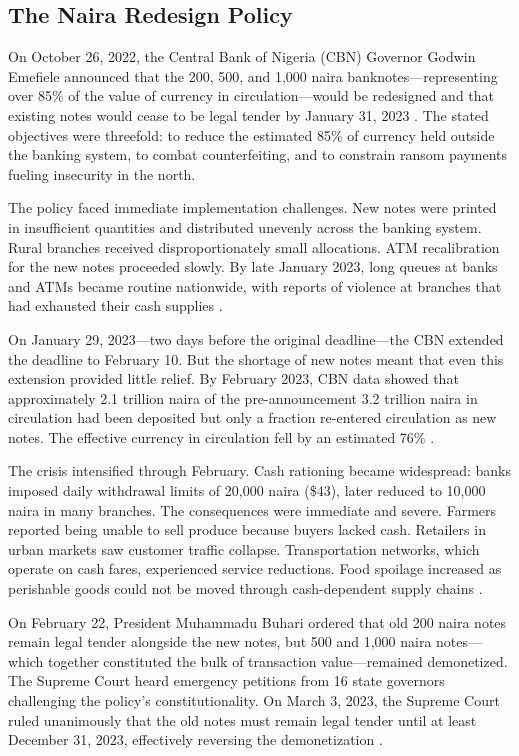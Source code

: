 \documentclass[12pt]{article}
\begin{document}
\subsection{The Naira Redesign Policy}

On October 26, 2022, the Central Bank of Nigeria (CBN) Governor Godwin Emefiele announced that the 200, 500, and 1,000 naira banknotes---representing over 85\% of the value of currency in circulation---would be redesigned and that existing notes would cease to be legal tender by January 31, 2023 \citep{cbn2022redesign}. The stated objectives were threefold: to reduce the estimated 85\% of currency held outside the banking system, to combat counterfeiting, and to constrain ransom payments fueling insecurity in the north.

The policy faced immediate implementation challenges. New notes were printed in insufficient quantities and distributed unevenly across the banking system. Rural branches received disproportionately small allocations. ATM recalibration for the new notes proceeded slowly. By late January 2023, long queues at banks and ATMs became routine nationwide, with reports of violence at branches that had exhausted their cash supplies \citep{economist2023naira, punch2023}.

On January 29, 2023---two days before the original deadline---the CBN extended the deadline to February 10. But the shortage of new notes meant that even this extension provided little relief. By February 2023, CBN data showed that approximately 2.1 trillion naira of the pre-announcement 3.2 trillion naira in circulation had been deposited but only a fraction re-entered circulation as new notes. The effective currency in circulation fell by an estimated 76\% \citep{cbn2023data}.

The crisis intensified through February. Cash rationing became widespread: banks imposed daily withdrawal limits of 20,000 naira (\$43), later reduced to 10,000 naira in many branches. The consequences were immediate and severe. Farmers reported being unable to sell produce because buyers lacked cash. Retailers in urban markets saw customer traffic collapse. Transportation networks, which operate on cash fares, experienced service reductions. Food spoilage increased as perishable goods could not be moved through cash-dependent supply chains \citep{fao2023nigeria}.

On February 22, President Muhammadu Buhari ordered that old 200 naira notes remain legal tender alongside the new notes, but 500 and 1,000 naira notes---which together constituted the bulk of transaction value---remained demonetized. The Supreme Court heard emergency petitions from 16 state governors challenging the policy's constitutionality. On March 3, 2023, the Supreme Court ruled unanimously that the old notes must remain legal tender until at least December 31, 2023, effectively reversing the demonetization \citep{supremecourt2023}.
\end{document}
